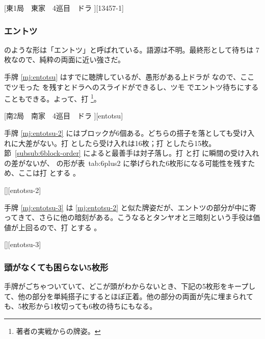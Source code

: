\documentclass[../nankiru_main.tex]{subfiles}
\begin{document}
[東1局　東家　4巡目　ドラ ][13457-1]


\subsubsection{エントツ}

 のような形は「エントツ」と呼ばれている。語源は不明。最終形として待ちは  7枚なので、純粋の両面に近い強さだ。

手牌 \ref{mj:entotsu} はすでに聴牌しているが、愚形がある上ドラが  なので、ここでツモった  を残すとドラへのスライドができるし、ツモ  でエントツ待ちにすることもできる。よって、打 \footnote{著者の実戦からの牌姿。}。

[南2局　南家　4巡目　ドラ ][entotsu]

手牌 \ref{mj:entotsu-2} にはブロックが6個ある。どちらの搭子を落としても受け入れに大差がない。打  としたら受け入れは16枚；打  としたら15枚。節~\ref{subsub:6block-order} によると最善手は対子落し。打  と打  に瞬間の受け入れの差がないが、  の形が表~{tab:6plus2} に挙げられた6枚形になる可能性を残すため、ここは打  とする \citep[][p.~130]{uzaku-haikouritsu}。

[][entotsu-2]

手牌 \ref{mj:entotsu-3} は \ref{mj:entotsu-2} と似た牌姿だが、エントツの部分が中に寄ってきて、さらに他の暗刻がある。こうなるとタンヤオと三暗刻という手役は価値が上回るので、打  とする \citep[][p.~131]{uzaku-haikouritsu}。

[][entotsu-3]

\subsubsection{頭がなくても困らない5枚形}

手牌がごちゃついていて、どこが頭がわからないとき、下記の5枚形をキープして、他の部分を単純搭子にするとほぼ正着。他の部分の両面が先に埋まられても、5枚形から1枚切っても6枚の待ちにもなる。
\end{document}
